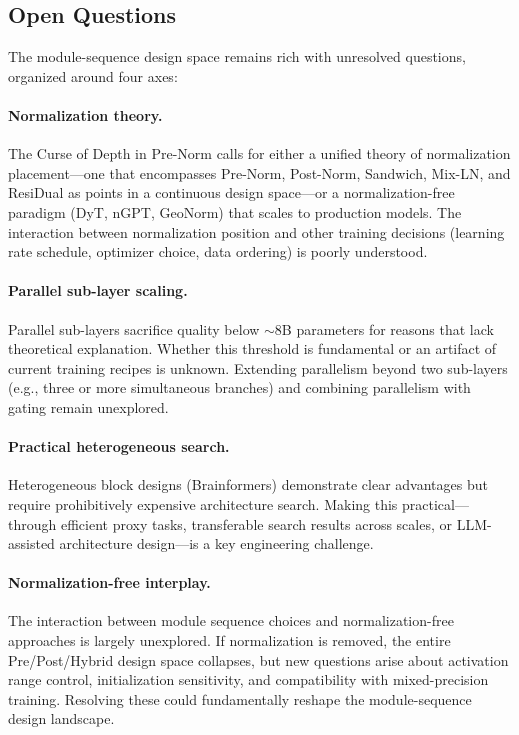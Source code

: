 \subsection{Open Questions}

The module-sequence design space remains rich with unresolved questions, organized around four axes:

\paragraph{Normalization theory.} The Curse of Depth in Pre-Norm calls for either a unified theory of normalization placement---one that encompasses Pre-Norm, Post-Norm, Sandwich, Mix-LN, and ResiDual as points in a continuous design space---or a normalization-free paradigm (DyT, nGPT, GeoNorm) that scales to production models. The interaction between normalization position and other training decisions (learning rate schedule, optimizer choice, data ordering) is poorly understood.

\paragraph{Parallel sub-layer scaling.} Parallel sub-layers sacrifice quality below $\sim$8B parameters for reasons that lack theoretical explanation. Whether this threshold is fundamental or an artifact of current training recipes is unknown. Extending parallelism beyond two sub-layers (e.g., three or more simultaneous branches) and combining parallelism with gating remain unexplored.

\paragraph{Practical heterogeneous search.} Heterogeneous block designs (Brainformers) demonstrate clear advantages but require prohibitively expensive architecture search. Making this practical---through efficient proxy tasks, transferable search results across scales, or LLM-assisted architecture design---is a key engineering challenge.

\paragraph{Normalization-free interplay.} The interaction between module sequence choices and normalization-free approaches is largely unexplored. If normalization is removed, the entire Pre/Post/Hybrid design space collapses, but new questions arise about activation range control, initialization sensitivity, and compatibility with mixed-precision training. Resolving these could fundamentally reshape the module-sequence design landscape.
